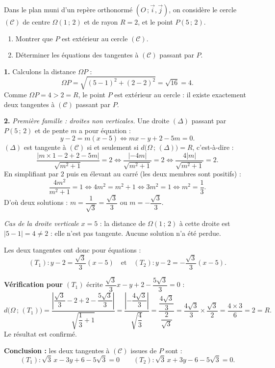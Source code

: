 \documentclass[11pt]{article}
\begin{document}
\begin{exoresolu}
Dans le plan muni d'un repère orthonormé $(O\,;\vec{i},\vec{j})$, on considère le cercle $(\mathcal{C})$ de centre $\Omega(1\,;\,2)$ et de rayon $R=2$, et le point $P(5\,;\,2)$.
\begin{enumerate}
\item Montrer que $P$ est extérieur au cercle $(\mathcal{C})$.
\item Déterminer les équations des tangentes à $(\mathcal{C})$ passant par $P$.
\end{enumerate}
\tcblower
\textbf{1.} Calculons la distance $\Omega P$ :
\[\Omega P=\sqrt{(5-1)^2+(2-2)^2}=\sqrt{16}=4.\]
Comme $\Omega P=4>2=R$, le point $P$ est extérieur au cercle : il existe exactement deux tangentes à $(\mathcal{C})$ passant par $P$.

\textbf{2.} \emph{Première famille : droites non verticales.} Une droite $(\Delta)$ passant par $P(5\,;\,2)$ et de pente $m$ a pour équation :
\[y-2=m(x-5) \iff mx-y+2-5m=0.\]
$(\Delta)$ est tangente à $(\mathcal{C})$ si et seulement si $d\big(\Omega\,;\,(\Delta)\big)=R$, c'est-à-dire :
\[\frac{|m\times 1-2+2-5m|}{\sqrt{m^2+1}}=2 \iff \frac{|-4m|}{\sqrt{m^2+1}}=2 \iff \frac{4|m|}{\sqrt{m^2+1}}=2.\]
En simplifiant par $2$ puis en élevant au carré (les deux membres sont positifs) :
\[\frac{4m^2}{m^2+1}=1 \iff 4m^2=m^2+1 \iff 3m^2=1 \iff m^2=\frac{1}{3}.\]
D'où deux solutions : $m=\dfrac{1}{\sqrt{3}}=\dfrac{\sqrt{3}}{3}$ ou $m=-\dfrac{\sqrt{3}}{3}$.

\emph{Cas de la droite verticale} $x=5$ : la distance de $\Omega(1\,;\,2)$ à cette droite est $|5-1|=4\neq 2$ : elle n'est pas tangente. Aucune solution n'a été perdue.

Les deux tangentes ont donc pour équations :
\[(T_1) : y-2=\frac{\sqrt{3}}{3}(x-5) \quad\text{et}\quad (T_2) : y-2=-\frac{\sqrt{3}}{3}(x-5).\]

\textbf{Vérification pour $(T_1)$} écrite $\dfrac{\sqrt{3}}{3}x-y+2-\dfrac{5\sqrt{3}}{3}=0$ :
\[d\big(\Omega\,;\,(T_1)\big)=\frac{\left|\dfrac{\sqrt{3}}{3}-2+2-\dfrac{5\sqrt{3}}{3}\right|}{\sqrt{\dfrac{1}{3}+1}}=\frac{\left|-\dfrac{4\sqrt{3}}{3}\right|}{\sqrt{\dfrac{4}{3}}}=\frac{\dfrac{4\sqrt{3}}{3}}{\dfrac{2}{\sqrt{3}}}=\frac{4\sqrt{3}}{3}\times\frac{\sqrt{3}}{2}=\frac{4\times 3}{6}=2=R.\]
Le résultat est confirmé.

\textbf{Conclusion :} les deux tangentes à $(\mathcal{C})$ issues de $P$ sont :
\[(T_1) : \sqrt{3}\,x-3y+6-5\sqrt{3}=0 \qquad (T_2) : \sqrt{3}\,x+3y-6-5\sqrt{3}=0.\]
\end{exoresolu}
\end{document}
